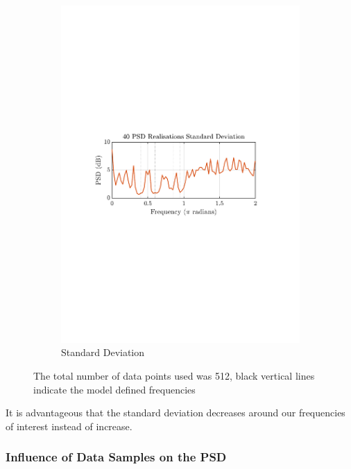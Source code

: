 \documentclass[12pt]{article}
\begin{document}
\begin{figure}[H]
\begin{subfigure}{0.49\textwidth}
			\includegraphics[trim={2.2cm 11.2cm 3.15cm  11.2cm}, clip, width=\textwidth]{../MATLAB/figures/q1_3c_fig02.pdf} 
			\captionsetup{justification=centering}
			\caption{Standard Deviation}
		\end{subfigure}
		\captionsetup{justification=centering}
		\caption{The total number of data points used was 512, black vertical lines indicate the model defined frequencies}
		\label{fig: 1-3c}
	\end{figure}

	It is advantageous that the standard deviation decreases around our frequencies of interest instead of increase.

	\subsubsection{Influence of Data Samples on the PSD}
	
\end{document}
